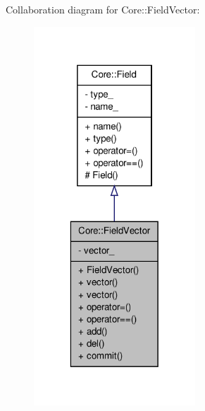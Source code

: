 Collaboration diagram for Core::FieldVector:
\nopagebreak
\begin{figure}[H]
\begin{center}
\leavevmode
\includegraphics[width=172pt]{d8/d31/classCore_1_1FieldVector__coll__graph}
\end{center}
\end{figure}
